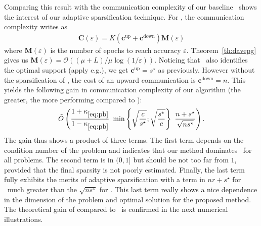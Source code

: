 Comparing this result with the communication complexity of our baseline \dave~shows the interest of our adaptive sparsification technique. For \dave, the communication complexity writes as 
\begin{align*}%
    \mathbf{C}(\varepsilon) = K( \mathbf{c}^{\mathrm{up}} + \mathbf{c}^{\mathrm{down}} ) \mathbf{M}(\varepsilon) 
\end{align*}
where $\mathbf{M}(\varepsilon)$ is the number of epochs to reach accuracy $\varepsilon$. Theorem~\ref{th:davepg} gives us  $\mathbf{M}(\varepsilon) = \mathcal{O}((\mu+L)/\mu\log(1/\varepsilon))$. 
Noticing that \dave~also identifies the optimal support (apply e.g.\;\cite[Cor.]{iutzeler2020SVAA}),
we get $\mathbf{c^{\mathrm{up}}} = s^\star$ as previously. However without the sparsification of \salgo, the cost of an upward communication is $\mathbf{c^{\mathrm{down}}} = n$. This yields the following gain in communication complexity of our algorithm %
(the greater, the more performing \recoalgo compared to \dave):
\begin{align*}
      \tilde{O}\left( \frac{1+\kappa_{\eqref{eq:pb}}}{1-\kappa_{\eqref{eq:pb}}}   ~ \min \left\{\sqrt{\frac{c}{s^\star}};\sqrt{\frac{s^\star}{c}} \right\} ~ \frac{n+s^\star}{\sqrt{ns^\star}}  \right).
\end{align*}
The gain thus shows a product of three terms. 
The first term depends on the condition number of the problem and indicates that our method dominates \dave~for all problems.
The second term is in $(0,1]$ but should be not too far from $1$, provided that the final sparsity is not poorly estimated. Finally, the last term fully exhibits the merits of adaptive sparsification with a term in $n r + s^\star $ for \dave~much greater than the $\sqrt{ns^\star}$ for \recoalgo. This last term really shows a nice dependence in the dimension of the problem and optimal solution for the proposed method. The theoretical gain of \recoalgo compared to \dave~is confirmed in the next numerical illustrations.